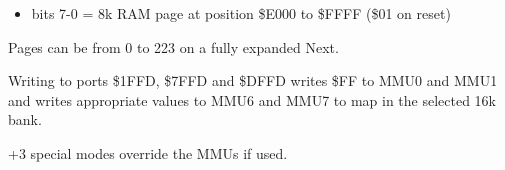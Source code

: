 \begin{itemize}
\item bits 7-0 = 8k RAM page at position \$E000 to \$FFFF (\$01 on
  reset)
\end{itemize}
Pages can be from 0 to 223 on a fully expanded Next.

Writing to ports \$1FFD, \$7FFD and \$DFFD writes \$FF to MMU0 and
MMU1 and writes appropriate values to MMU6 and MMU7 to map in the
selected 16k bank.

+3 special modes override the MMUs if used.

